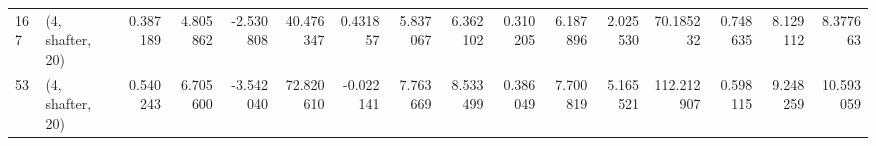 \begin{tabular}{llrrrrrrrrrrrrrr}
167 &  (4, shafter, 20) &   0.387189 &   4.805862 &  -2.530808 &    40.476347 &   0.431857 &   5.837067 &   6.362102 &  0.310205 &   6.187896 &   2.025530 &     70.185232 &   0.748635 &   8.129112 &    8.377663 \\
53  &  (4, shafter, 20) &   0.540243 &   6.705600 &  -3.542040 &    72.820610 &  -0.022141 &   7.763669 &   8.533499 &  0.386049 &   7.700819 &   5.165521 &    112.212907 &   0.598115 &   9.248259 &   10.593059 \\
\bottomrule
\end{tabular}
